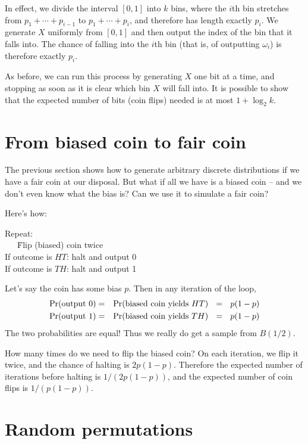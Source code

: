 \noindent
In effect, we divide the interval $[0,1]$ into $k$ bins, where the $i$th bin stretches
from $p_1 + \cdots + p_{i-1}$ to $p_1 + \cdots + p_i$, and therefore has length 
exactly $p_i$. We generate $X$ uniformly from $[0,1]$ and then output the index of
the bin that it falls into. The chance of falling into the $i$th bin (that is, of 
outputting $\omega_i$) is therefore exactly $p_i$.

As before, we can run this process by generating $X$ one bit at a time, and stopping
as soon as it is clear which bin $X$ will fall into. It is possible to show that the
expected number of bits (coin flips) needed is at most $1 + \log_2 k$.


\section{From biased coin to fair coin}

The previous section shows how to generate arbitrary discrete distributions if we
have a fair coin at our disposal. But what if all we have is a biased coin -- and
we don't even know what the bias is? Can we use it to simulate a fair coin?

Here's how:
\begin{tt}
\begin{tabbing}
Repeat:  \\
\ \ \ \= Flip (biased) coin twice \\
      \> If outcome is $HT$: halt and output 0 \\
      \> If outcome is $TH$: halt and output 1 
\end{tabbing}
\end{tt}

\noindent
Let's say the coin has some bias $p$. Then in any iteration of the loop,
\begin{eqnarray*}
\mbox{\rm Pr}(\mbox{output 0})  & = & \mbox{\rm Pr}(\mbox{biased coin yields $HT$}) \ \ = \ \ p(1-p) \\
\mbox{\rm Pr}(\mbox{output 1})  & = & \mbox{\rm Pr}(\mbox{biased coin yields $TH$}) \ \ = \ \ p(1-p)
\end{eqnarray*}
The two probabilities are equal! Thus we really do get a sample from $B(1/2)$.

How many times do we need to flip the biased coin? On each iteration, we flip it
twice, and the chance of halting is $2p(1-p)$. Therefore the expected number of
iterations before halting is $1/(2p(1-p))$, and the expected number of coin 
flips is $1/(p(1-p))$.


\section{Random permutations}

